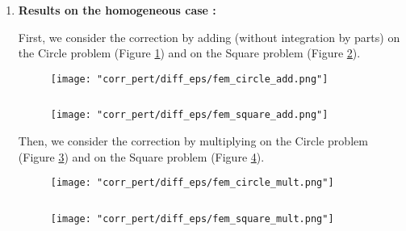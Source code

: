 \begin{enumerate}[label=\textbullet]
	\item \textbf{Results on the homogeneous case :}
	
	First, we consider the correction by adding (without integration by parts) on the Circle problem (Figure \ref{corr_pert_fem_circle_add}) and on the Square problem (Figure \ref{corr_pert_fem_square_add}).
	
	\begin{minipage}{0.48\linewidth}
		\begin{figure}[H]
			\centering
			\texttt{[image: "corr\_pert/diff\_eps/fem\_circle\_add.png"]}
			\label{corr_pert_fem_circle_add}
		\end{figure} 
	\end{minipage} $\qquad$
	\begin{minipage}{0.48\linewidth}
		\begin{figure}[H]
			\centering
			\texttt{[image: "corr\_pert/diff\_eps/fem\_square\_add.png"]}
			\label{corr_pert_fem_square_add}
		\end{figure} 
	\end{minipage}
	
	Then, we consider the correction by multiplying on the Circle problem (Figure \ref{corr_pert_fem_circle_mult}) and on the Square problem (Figure \ref{corr_pert_fem_square_mult}).
	
	\begin{minipage}{0.48\linewidth}
		\begin{figure}[H]
			\centering
			\texttt{[image: "corr\_pert/diff\_eps/fem\_circle\_mult.png"]}
			\label{corr_pert_fem_circle_mult}
		\end{figure} 
	\end{minipage} $\qquad$
	\begin{minipage}{0.48\linewidth}
		\begin{figure}[H]
			\centering
			\texttt{[image: "corr\_pert/diff\_eps/fem\_square\_mult.png"]}
			\label{corr_pert_fem_square_mult}
		\end{figure} 
	\end{minipage}
	

\end{enumerate}

